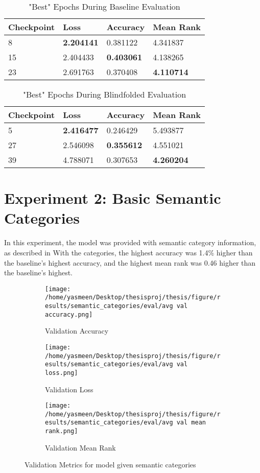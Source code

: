 \begin{table}[h!]
\centering
\caption{"Best" Epochs During Baseline Evaluation}
\begin{tabular}{l | l | l | l}
Checkpoint & Loss & Accuracy & Mean Rank \\
\hline
8 & \textbf{2.204141} & 0.381122 & 4.341837 \\
15 & 2.404433 & \textbf{0.403061} & 4.138265 \\
23 & 2.691763 & 0.370408 & \textbf{4.110714}
\end{tabular}
\label{tab:best_baseline}
\end{table}

\begin{table}[h!]
\centering
\caption{"Best" Epochs During Blindfolded Evaluation}
\begin{tabular}{l | l | l | l}
Checkpoint & Loss & Accuracy & Mean Rank \\
\hline
5 & \textbf{2.416477} & 0.246429 & 5.493877 \\
27 & 2.546098 & \textbf{0.355612} & 4.551021 \\
39 & 4.788071 & 0.307653 & \textbf{4.260204}
\end{tabular}
\label{tab:best_blindfolded}
\end{table}


\section{Experiment 2: Basic Semantic Categories}
In this experiment, the model was provided with semantic category information, as described in 
With the categories, the highest accuracy was 1.4\% higher than the baseline's highest accuracy, and the highest mean rank was 0.46 higher than the baseline's highest.

\begin{figure}[h!]
     \centering
     \begin{subfigure}[b]{0.3\textwidth}
         \centering
         \texttt{[image: /home/yasmeen/Desktop/thesisproj/thesis/figure/results/semantic\_categories/eval/avg val accuracy.png]}
         \caption{Validation Accuracy}
         \label{fig:category_accuracy}
     \end{subfigure}
     \hfill
     \begin{subfigure}[b]{0.3\textwidth}
         \centering
         \texttt{[image: /home/yasmeen/Desktop/thesisproj/thesis/figure/results/semantic\_categories/eval/avg val loss.png]}
         \caption{Validation Loss}
         \label{fig:category_loss}
     \end{subfigure}
     \hfill
     \begin{subfigure}[b]{0.3\textwidth}
         \centering
         \texttt{[image: /home/yasmeen/Desktop/thesisproj/thesis/figure/results/semantic\_categories/eval/avg val mean rank.png]}
         \caption{Validation Mean Rank}
         \label{fig:category_mean_rank}
     \end{subfigure}
     \caption{Validation Metrics for model given semantic categories}
     \label{fig:category_metrics}
\end{figure}


